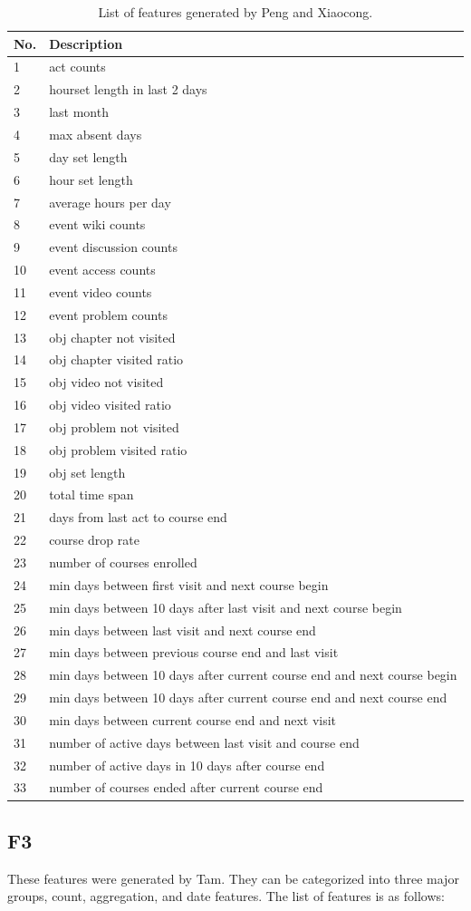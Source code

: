 \begin{center}
  \begin{table}[ht]
    \begin{minipage}{\textwidth}
    {
      \small
      \hfill{}
      \begin{tabular}{|l|l|}
      \hline
      \textbf{No.}&\textbf{Description}\tabularnewline \hline
1 & act counts \tabularnewline
2 & hourset length in last 2 days \tabularnewline
3 & last month \tabularnewline
4 & max absent days \tabularnewline
5 & day set length \tabularnewline
6 & hour set length \tabularnewline
7 & average hours per day \tabularnewline
8 & event wiki counts \tabularnewline
9 & event discussion counts \tabularnewline
10 & event access counts \tabularnewline
11 & event video counts \tabularnewline
12 & event problem counts \tabularnewline
13 & obj chapter not visited \tabularnewline
14 & obj chapter visited ratio \tabularnewline
15 & obj video not visited \tabularnewline
16 & obj video visited ratio \tabularnewline
17 & obj problem not visited \tabularnewline
18 & obj problem visited ratio \tabularnewline
19 & obj set length \tabularnewline
20 & total time span \tabularnewline
21 & days from last act to course end \tabularnewline
22 & course drop rate \tabularnewline
23 & number of courses enrolled \tabularnewline
24 & min days between first visit and next course begin \tabularnewline
25 & min days between 10 days after last visit and next course begin \tabularnewline
26 & min days between last visit and next course end \tabularnewline
27 & min days between previous course end and last visit \tabularnewline
28 & min days between 10 days after current course end and next course begin \tabularnewline
29 & min days between 10 days after current course end and next course end \tabularnewline
30 & min days between current course end and next visit \tabularnewline
31 & number of active days between last visit and course end \tabularnewline
32 & number of active days in 10 days after course end \tabularnewline
33 & number of courses ended after current course end \tabularnewline
      \hline
      \end{tabular}
    }
    \hfill{}
    \caption{List of features generated by Peng and Xiaocong.}
    \label{tb:rwfeature}
    \end{minipage}
  \end{table}
\end{center}

\subsection{F3}
These features were generated by Tam. They can be categorized into three major groups, count, aggregation, and date features. The list of features is as follows:
